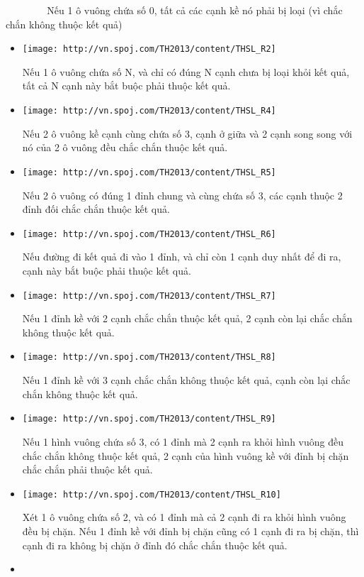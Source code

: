           Nếu 1 ô vuông chứa số 0, tất cả các cạnh kề nó phải bị loại (vì chắc chắn không thuộc kết quả)
\begin{itemize}
	\item 
\texttt{[image: http://vn.spoj.com/TH2013/content/THSL\_R2]}  

Nếu 1 ô vuông chứa số N, và chỉ có đúng N cạnh chưa bị loại khỏi kết quả, tất cả N cạnh này bắt buộc phải thuộc kết quả.
	\item 


\texttt{[image: http://vn.spoj.com/TH2013/content/THSL\_R4]}  

Nếu 2 ô vuông kề cạnh cùng chứa số 3, cạnh ở giữa và 2 cạnh song song với nó của 2 ô vuông đều chắc chắn thuộc kết quả.
	\item 


\texttt{[image: http://vn.spoj.com/TH2013/content/THSL\_R5]} 

Nếu 2 ô vuông có đúng 1 đỉnh chung và cùng chứa số 3, các cạnh thuộc 2 đỉnh đối chắc chắn thuộc kết quả.
	\item 


\texttt{[image: http://vn.spoj.com/TH2013/content/THSL\_R6]} 

Nếu đường đi kết quả đi vào 1 đỉnh, và chỉ còn 1 cạnh duy nhất để đi ra, cạnh này bắt buộc phải thuộc kết quả.
	\item 


\texttt{[image: http://vn.spoj.com/TH2013/content/THSL\_R7]} 

Nếu 1 đỉnh kề với 2 cạnh chắc chắn thuộc kết quả, 2 cạnh còn lại chắc chắn không thuộc kết quả.
	\item 


\texttt{[image: http://vn.spoj.com/TH2013/content/THSL\_R8]} 

Nếu 1 đỉnh kề với 3 cạnh chắc chắn không thuộc kết quả, cạnh còn lại chắc chắn không thuộc kết quả.
	\item 


\texttt{[image: http://vn.spoj.com/TH2013/content/THSL\_R9]} 

Nếu 1 hình vuông chứa số 3, có 1 đỉnh mà 2 cạnh ra khỏi hình vuông đều chắc chắn không thuộc kết quả, 2 cạnh của hình vuông kề với đỉnh bị chặn chắc chắn phải thuộc kết quả.
	\item 


\texttt{[image: http://vn.spoj.com/TH2013/content/THSL\_R10]} 

Xét 1 ô vuông chứa số 2, và có 1 đỉnh mà cả 2 cạnh đi ra khỏi hình vuông đều bị chặn. Nếu 1 đỉnh kề với đỉnh bị chặn cũng có 1 cạnh đi ra bị chặn, thì cạnh đi ra không bị chặn ở đỉnh đó chắc chắn thuộc kết quả.
	\item 



\end{itemize}
